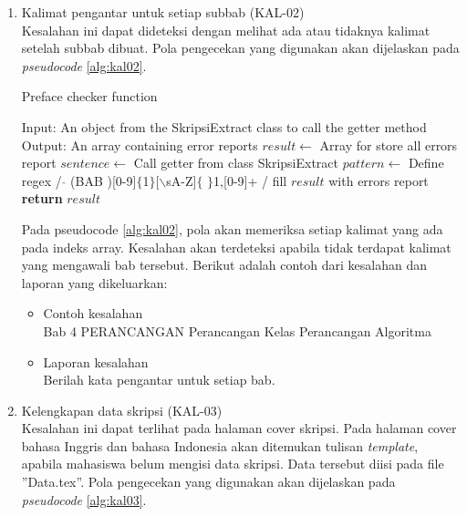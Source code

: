 \begin{enumerate}
	\item Kalimat pengantar untuk setiap subbab (KAL-02) \\
	Kesalahan ini dapat dideteksi dengan melihat ada atau tidaknya kalimat setelah subbab dibuat. Pola pengecekan yang digunakan akan dijelaskan pada \textit{pseudocode} \ref{alg:kal02}.

\begin{minipage}{1.0\linewidth}
\begin{algorithm}[H]
    \caption{Preface checker function}
	\label{alg:kal02}
	\begin{algorithmic}[1]
		\State Input: An object from the SkripsiExtract class to call the getter method
		\State Output: An array containing error reports    
		\State	
    		\State $result \gets$ Array for store all errors report
			\State $sentence \gets$ Call getter from class SkripsiExtract
				\State $pattern \gets$ Define regex / $\hat{}$ (BAB )[0-9]$\lbrace$1$\rbrace$[$\backslash$sA-Z]$\lbrace$ $\rbrace$1,[0-9]+ /
                	\State fill $result$ with errors report
            	\EndIf
        	\EndFor
    		\State \textbf{return} $result$
    	\EndFunction
	\end{algorithmic}
\end{algorithm}
\end{minipage}
\medskip

	Pada pseudocode \ref{alg:kal02}, pola akan memeriksa setiap kalimat yang ada pada indeks array. Kesalahan akan terdeteksi apabila tidak terdapat kalimat yang mengawali bab tersebut. Berikut adalah contoh dari kesalahan dan laporan yang dikeluarkan:
	
	\begin{itemize}
		\item Contoh kesalahan \\
		Bab 4 \newline PERANCANGAN \newline {} Perancangan Kelas  Perancangan Algoritma
		\item Laporan kesalahan \\
		Berilah kata pengantar untuk setiap bab.
	\end{itemize}
	
	\item Kelengkapan data skripsi (KAL-03) \\
	Kesalahan ini dapat terlihat pada halaman cover skripsi. Pada halaman cover bahasa Inggris dan bahasa Indonesia akan ditemukan tulisan \textit{template}, apabila mahasiswa belum mengisi data skripsi. Data tersebut diisi pada file ''Data.tex''. Pola pengecekan yang digunakan akan dijelaskan pada \textit{pseudocode} \ref{alg:kal03}.
	

\end{enumerate}
